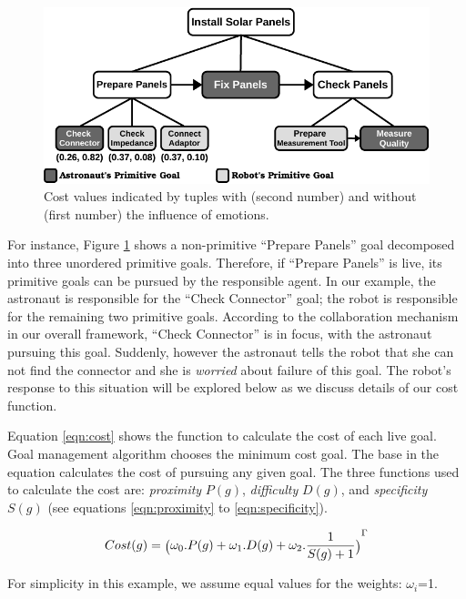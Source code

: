 \documentclass[12pt]{report}
\begin{document}
\begin{figure}[tbh]
  \centering
  \includegraphics[width=1\textwidth]{figure/goal_management_collaboration_structure-croped.pdf}
  \caption{Cost values indicated by tuples with (second number) and without
  (first number) the influence of emotions.}
  \label{fig:task-model-astronaut}
\end{figure}

For instance, Figure \ref{fig:task-model-astronaut} shows a non-primitive
``Prepare Panels'' goal decomposed into three unordered primitive goals.
Therefore, if ``Prepare Panels'' is live, its primitive goals can be pursued by
the responsible agent. In our example, the astronaut is responsible for the
``Check Connector'' goal; the robot is responsible for the remaining two
primitive goals. According to the collaboration mechanism in our overall
framework, ``Check Connector'' is in focus, with the astronaut pursuing this
goal. Suddenly, however the astronaut tells the robot that she can not find the
connector and she is \textit{worried} about failure of this goal. The robot's
response to this situation will be explored below as we discuss details of our
cost function.

Equation \ref{eqn:cost} shows the function to calculate the cost of each live
goal. Goal management algorithm chooses the minimum cost goal. The base in the
equation calculates the cost of pursuing any given goal. The three functions
used to calculate the cost are: \textit{proximity} $P(g)$, \textit{difficulty}
$D(g)$, and \textit{specificity} $S(g)$ (see equations \ref{eqn:proximity} to
\ref{eqn:specificity}).

\begin{equation}
{\fontsize{6}{9}\selectfont Cost(g) =
\big(\omega_0.P(g)+\omega_1.D(g)+\omega_2.\frac{1}{S(g)+1}\big)}^{\Gamma}
\label{eqn:cost}
\end{equation}

\noindent For simplicity in this example, we assume equal values for the
weights:
$\omega_i$=1.
\end{document}
